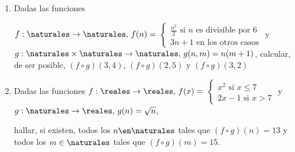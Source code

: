 \begin{enunciado}{\ejercicio}
\begin{enumerate}[label=\roman*)]
 \item Dadas las funciones 
 
 $f : \naturales \to \naturales, \, f(n)= $
 $
 \begin{cases}
 \frac{n^2}{2} \text{ si } n \text{ es divisible por } 6 \\
 3n + 1 \text{ en los otros casos}
 \end{cases}
 $
 y
 $g : \naturales \times \naturales \to \naturales, \, g(n,m) = n(m + 1)$,
 calcular, de ser posible, $(f \circ g)(3, 4)$, $(f \circ g)(2, 5)$ y $(f \circ g)(3, 2)$

 \item Dadas las funciones 
 $f : \reales \to \reales, \, f(x)= $
 $
 \begin{cases}
 x^2 \text{ si } x \leq 7 \\
 2x - 1 \text{ si } x > 7
 \end{cases}
 $
 y
 $g : \naturales \to \reales, \, g(n) = \sqrt{n}$, 

 hallar, si existen, todos los $n \en \naturales$ tales que $(f \circ g)(n) = 13$ y todos los
 $m \in \naturales$ tales que $(f \circ g)(m) = 15$.
\end{enumerate}
\end{enunciado}

